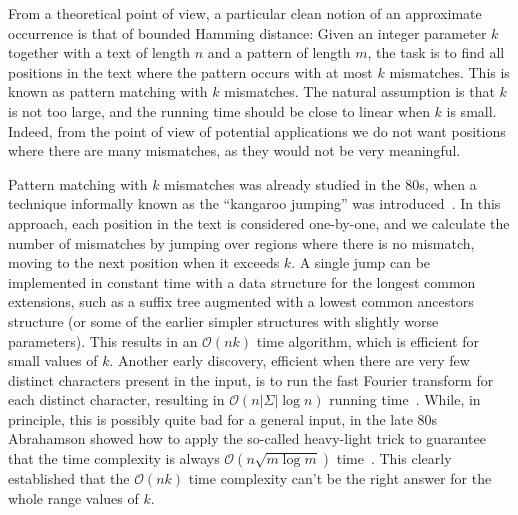 \documentclass[a4paper,11pt]{article}
\renewcommand{\O}{\mathcal{O}}
\begin{document}
From a theoretical point of view, a particular clean notion of an approximate occurrence is that of bounded Hamming distance: Given an integer parameter $k$ together with a text of length $n$ and a pattern of length $m$, the task is to find all
positions in the text where the pattern occurs with at most $k$ mismatches. This is known as pattern matching with $k$
mismatches. The natural assumption is that $k$ is not too large,
and the running time should be close to linear when $k$ is small. Indeed, from the point of view of potential applications we do
not want positions where there are many mismatches, as they would not be very meaningful.

Pattern matching with $k$ mismatches was already studied in the 80s, when a technique informally known as
the ``kangaroo jumping'' was introduced~\cite{Landau1986,Galil1986}. In this approach,
each position in the text is considered one-by-one, and we calculate the number of mismatches
by jumping over regions where there is no mismatch, moving to the next position when it exceeds $k$.
A single jump can be implemented in constant time with a data structure for the longest common extensions, such
as a suffix tree augmented with a lowest common ancestors structure (or some of the earlier simpler structures with slightly worse
parameters). This results in an $\O(nk)$ time algorithm, which is efficient for small values of $k$.
Another early discovery, efficient when there are very few distinct characters present in the input,
is to run the fast Fourier transform for each distinct character, resulting in $\O(n|\Sigma|\log n)$ running time~\cite{FischerP74}.
While, in principle, this is possibly quite bad for a general input, in the late 80s Abrahamson showed
how to apply the so-called heavy-light trick to guarantee that the time complexity is always
$\O(n \sqrt{m \log m})$ time~\cite{Abrahamson1987}. This clearly established that the $\O(nk)$ time complexity
can't be the right answer for the whole range values of $k$.
\end{document}
